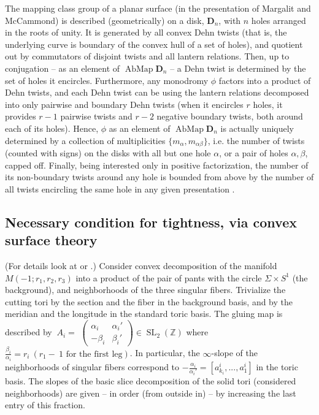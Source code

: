 \documentclass{amsart}
\theoremstyle{definition}
\begin{document}
The mapping class group of a planar surface (in the presentation of Margalit and McCammond) is described (geometrically) on a disk, $\mathbf D_n$, with $n$ holes arranged in the roots of unity. It is generated by all convex Dehn twists (that is, the underlying curve is boundary of the convex hull of a set of holes), and quotient out by commutators of disjoint twists and all lantern relations. Then, up to conjugation -- as an element of $\operatorname{AbMap}\mathbf D_n$ -- a Dehn twist is determined by the set of holes it encircles. Furthermore, any monodromy $\phi$ factors into a product of Dehn twists, and each Dehn twist can be using the lantern relations decomposed into only pairwise and boundary Dehn twists (when it encircles $r$ holes, it provides $r-1$ pairwise twists and $r-2$ negative boundary twists, both around each of its holes). Hence, $\phi$ as an element of $\operatorname{AbMap}\mathbf D_n$ is actually uniquely determined by a collection of multiplicities $\{m_\alpha,m_{\alpha\beta}\}$, i.e. the number of twists (counted with signs) on the disks with all but one hole $\alpha$, or a pair of holes $\alpha,\beta$, capped off. Finally, being interested only in positive factorization, the number of its non-boundary twists around any hole is bounded from above by the number of all twists encircling the same hole in any given presentation \cite[Lemma 3.1]{PVH-M}.

\subsection{Necessary condition for tightness, via convex surface theory} 
(For details look at \cite[Section 2]{GLS} or \cite[Section 4]{M}.) Consider convex decomposition of the manifold $M(-1;r_1,r_2,r_3)$ into a product of the pair of pants with the circle $\Sigma\times S^1$ (the background), and neighborhoods of the three singular fibers. Trivialize the cutting tori by the section and the fiber in the background basis, and by the meridian and the longitude in the standard toric basis. The gluing map is described by $\ A_i=$ {\tiny$\begin{pmatrix}     \alpha_i & \alpha_i'   \\  -\beta_i   & \beta_i' \end{pmatrix}$}$\in\operatorname{SL}_2({\mathbb Z})$ where $\frac{\beta_i}{\alpha_i}=r_i\ (r_1-\ 1 \text{ for the first leg})$. In particular, the $\infty$-slope of the neighborhoods of singular fibers correspond to $-\frac{\alpha_i}{\alpha_i'}=[a_{k_i}^i,...,a_1^i]$ in the toric basis. The slopes of the basic slice decomposition of the solid tori (considered neighborhoods) are given -- in order (from outside in) -- by increasing the last entry of this fraction.
\end{document}
